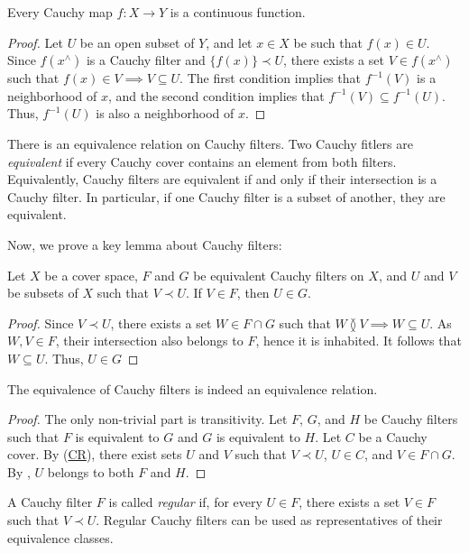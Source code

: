 \documentclass[reqno]{amsart}
\newcommand{\axref}[1]{(\hyperref[ax:#1]{#1})}
\theoremstyle{definition}
\theoremstyle{remark}
\numberwithin{figure}{section}
\newcommand{\overlap}[2]{#1 \between #2}
\newcommand{\rb}{\prec}
\begin{document}
\begin{prop}
Every Cauchy map $f : X \to Y$ is a continuous function.
\end{prop}
\begin{proof}
Let $U$ be an open subset of $Y$, and let $x \in X$ be such that $f(x) \in U$.
Since $f(x^\wedge)$ is a Cauchy filter and $\{ f(x) \} \rb U$, there exists a set $V \in f(x^\wedge)$ such that $f(x) \in V \implies V \subseteq U$.
The first condition implies that $f^{-1}(V)$ is a neighborhood of $x$, and the second condition implies that $f^{-1}(V) \subseteq f^{-1}(U)$.
Thus, $f^{-1}(U)$ is also a neighborhood of $x$.
\end{proof}

There is an equivalence relation on Cauchy filters.
Two Cauchy fitlers are \emph{equivalent} if every Cauchy cover contains an element from both filters.
Equivalently, Cauchy filters are equivalent if and only if their intersection is a Cauchy filter.
In particular, if one Cauchy filter is a subset of another, they are equivalent.

Now, we prove a key lemma about Cauchy filters:

\begin{lem}
Let $X$ be a cover space, $F$ and $G$ be equivalent Cauchy filters on $X$, and $U$ and $V$ be subsets of $X$ such that $V \rb U$.
If $V \in F$, then $U \in G$.
\end{lem}
\begin{proof}
Since $V \rb U$, there exists a set $W \in F \cap G$ such that $\overlap{W}{V} \implies W \subseteq U$.
As $W,V \in F$, their intersection also belongs to $F$, hence it is inhabited.
It follows that $W \subseteq U$.
Thus, $U \in G$
\end{proof}

\begin{prop}
The equivalence of Cauchy filters is indeed an equivalence relation.
\end{prop}
\begin{proof}
The only non-trivial part is transitivity.
Let $F$, $G$, and $H$ be Cauchy filters such that $F$ is equivalent to $G$ and $G$ is equivalent to $H$.
Let $C$ be a Cauchy cover.
By \axref{CR}, there exist sets $U$ and $V$ such that $V \rb U$, $U \in C$, and $V \in F \cap G$.
By , $U$ belongs to both $F$ and $H$.
\end{proof}

A Cauchy filter $F$ is called \emph{regular} if, for every $U \in F$, there exists a set $V \in F$ such that $V \rb U$.
Regular Cauchy filters can be used as representatives of their equivalence classes.
\end{document}
